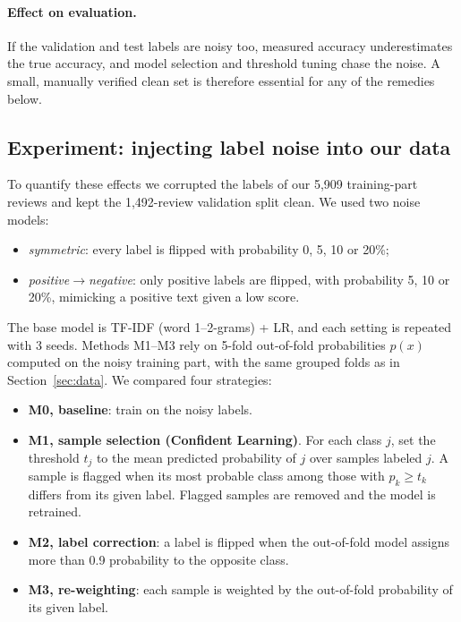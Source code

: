 \paragraph{Effect on evaluation.}
If the validation and test labels are noisy too, measured accuracy underestimates the true accuracy, and model selection and threshold tuning chase the noise.
A small, manually verified clean set is therefore essential for any of the remedies below.

\subsection{Experiment: injecting label noise into our data}
To quantify these effects we corrupted the labels of our 5{,}909 training-part reviews and kept the 1{,}492-review validation split clean.
We used two noise models:
\begin{itemize}
  \item \emph{symmetric}: every label is flipped with probability 0, 5, 10 or 20\%;
  \item \emph{positive$\to$negative}: only positive labels are flipped, with probability 5, 10 or 20\%, mimicking a positive text given a low score.
\end{itemize}
The base model is TF-IDF (word 1--2-grams) + LR, and each setting is repeated with 3 seeds.
Methods M1--M3 rely on 5-fold out-of-fold probabilities $p(x)$ computed on the noisy training part, with the same grouped folds as in Section~\ref{sec:data}. We compared four strategies:
\begin{itemize}
  \item \textbf{M0, baseline}: train on the noisy labels.
  \item \textbf{M1, sample selection (Confident Learning)}\cite{northcutt2021confident}. For each class $j$, set the threshold $t_j$ to the mean predicted probability of $j$ over samples labeled $j$. A sample is flagged when its most probable class among those with $p_k \ge t_k$ differs from its given label. Flagged samples are removed and the model is retrained.
  \item \textbf{M2, label correction}: a label is flipped when the out-of-fold model assigns more than 0.9 probability to the opposite class.
  \item \textbf{M3, re-weighting}: each sample is weighted by the out-of-fold probability of its given label.
\end{itemize}

